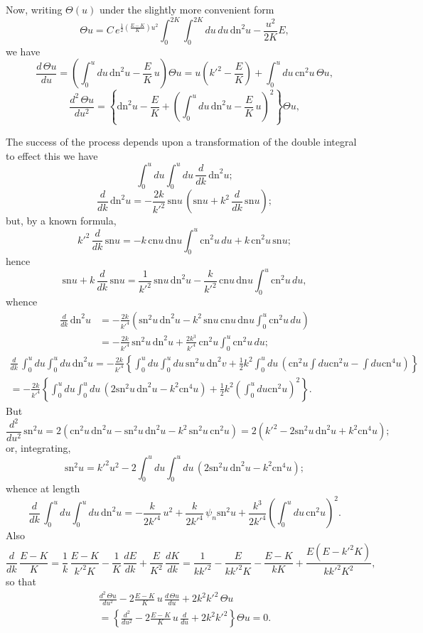 \documentclass[11pt,a4paper]{article}
\newcommand{\sno}{\mathrm{sn}}
\newcommand{\cno}{\mathrm{cn}}
\newcommand{\dno}{\mathrm{dn}}
\begin{document}
Now, writing $\Theta(u)$ under the slightly more convenient form
\[
\Theta u = C\,e^{\frac{1}{2}\left(\frac{E-K}{K}\right)u^2} \int_0^{2K} \!\!\int_0^{2K} du\,du\,\dno^2 u - \frac{u^2}{2K}E,
\]
we have
\[
\frac{d\,\Theta u}{du} = \left(\int_0^u du\,\dno^2 u - \frac{E}{K}\,u\right)\Theta u = u\left(k'^2 - \frac{E}{K}\right) + \int_0^u du\,\cno^2 u\,\Theta u,
\]
\[
\frac{d^2\,\Theta u}{du^2} = \left\{\dno^2 u - \frac{E}{K} + \left(\int_0^u du\,\dno^2 u - \frac{E}{K}\,u\right)^2\right\}\Theta u,
\]

\newpage
The success of the process depends upon a transformation of the double integral to effect this we have
\[
\int_0^u du \int_0^u du \,\frac{d}{dk}\,\dno^2 u;
\]
\[
\frac{d}{dk}\,\dno^2 u = -\frac{2k}{k'^2}\,\sno u\,(\sno u + k^2\,\frac{d}{dk}\,\sno u);
\]
but, by a known formula,
\[
k'^2\,\frac{d}{dk}\,\sno u = -k\,\cno u\,\dno u \int_0^u \cno^2 u\,du + k\,\cno^2 u\,\sno u;
\]
hence
\[
\sno u + k\,\frac{d}{dk}\,\sno u = \frac{1}{k'^2}\,\sno u\,\dno^2 u - \frac{k}{k'^2}\,\cno u\,\dno u \int_0^u \cno^2 u\,du,
\]
whence
\begin{align*}
\frac{d}{dk}\,\dno^2 u &= -\frac{2k}{k'^4}(\sno^2 u\,\dno^2 u - k^2\,\sno u\,\cno u\,\dno u \int_0^u \cno^2 u\,du) \\
&= -\frac{2k}{k'^4}\,\sno^2 u\,\dno^2 u + \frac{2k^3}{k'^4}\,\cno^2 u \int_0^u \cno^2 u\,du;
\end{align*}
\begin{multline*}
\frac{d}{dk}\,\int_0^u du \int_0^u du\,\dno^2 u = -\frac{2k}{k'^4}\left\{\int_0^u du \int_0^u du\,\sno^2 u\,\dno^2 v + \frac{1}{2}k^2 \int_0^u du\,(\cno^2 u \int \!du \cno^2 u - \int \!du \cno^4 u)\right\} \\
= -\frac{2k}{k'^4}\left\{\int_0^u \!du \int_0^u \!du\,(2\sno^2 u\,\dno^2 u - k^2\cno^4 u) + \tfrac{1}{2}k^2 (\int_0^u \!du \cno^2 u)^2\right\}.
\end{multline*}
But
\[
\frac{d^2}{du^2}\,\sno^2 u = 2(\cno^2 u\,\dno^2 u - \sno^2 u\,\dno^2 u - k^2\,\sno^2 u\,\cno^2 u) = 2(k'^2 - 2\sno^2 u\,\dno^2 u + k^2\cno^4 u);
\]
or, integrating,
\[
\sno^2 u = k'^2 u^2 - 2\int_0^u du \int_0^u du\,(2\sno^2 u\,\dno^2 u - k^2\cno^4 u);
\]
whence at length
\[
\frac{d}{dk}\,\int_0^u du \int_0^u du\,\dno^2 u = -\frac{k}{2k'^4}\,u^2 + \frac{k}{2k'^4}\,\psi_n \sno^2 u + \frac{k^3}{2k'^4}(\int_0^u du\,\cno^2 u)^2.
\]
Also
\[
\frac{d}{dk}\,\frac{E-K}{K} = \frac{1}{k}\,\frac{E-K}{k'^2K} - \frac{1}{K}\,\frac{dE}{dk} + \frac{E}{K^2}\,\frac{dK}{dk} = \frac{1}{kk'^2} - \frac{E}{kk'^2K} - \frac{E-K}{kK} + \frac{E(E-k'^2K)}{kk'^2K^2},
\]
so that
\begin{multline*}
\frac{d^2\,\Theta u}{du^2} - 2\frac{E-K}{K}\,u\,\frac{d\,\Theta u}{du} + 2k^2k'^2\,\Theta u \\
= \left\{\frac{d^2}{du^2} - 2\frac{E-K}{K}\,u\,\frac{d}{du} + 2k^2k'^2\right\}\Theta u = 0.
\end{multline*}
\end{document}

